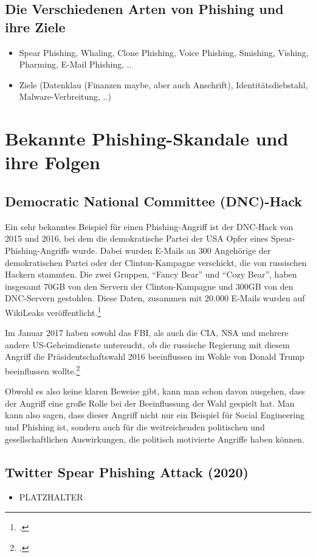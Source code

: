 \documentclass[12pt, a4paper, oneside]{scrartcl}
\begin{document}
\subsection{Die Verschiedenen Arten von Phishing und ihre Ziele}
\begin{itemize}
  \item Spear Phishing, Whaling, Clone Phishing, Voice Phishing, Smishing, Vishing, Pharming, E-Mail Phishing, ..
  \item Ziele (Datenklau (Finanzen maybe, aber auch Anschrift), Identitätsdiebstahl, Malware-Verbreitung, ..)
\end{itemize}

\section{Bekannte Phishing-Skandale und ihre Folgen}

\subsection{Democratic National Committee (DNC)-Hack}
Ein sehr bekanntes Beispiel für einen Phishing-Angriff ist der DNC-Hack von 2015 und 2016, 
bei dem die demokratische Partei der USA Opfer eines Spear-Phishing-Angriffs wurde. 
Dabei wurden E-Mails an 300 Angehörige der demokratischen Partei oder der Clinton-Kampagne
verschickt, die von russischen Hackern stammten. Die zwei Gruppen, ``Fancy Bear'' und ``Cozy Bear'',
haben insgesamt 70GB von den Servern der Clinton-Kampagne und 300GB von den DNC-Servern gestohlen.
Diese Daten, zusammen mit 20.000 E-Mails wurden auf WikiLeaks veröffentlicht.\footcite{IDStrong_DNC}
\par
Im Januar 2017 haben sowohl das FBI, als auch die CIA, NSA und mehrere andere US-Geheimdienste
untersucht, ob die russische Regierung mit diesem Angriff die Präsidentschaftswahl 2016 beeinflussen 
im Wohle von Donald Trump beeinflussen wollte.\footcite{NYT_DNC}
\par
Obwohl es also keine klaren Beweise gibt, kann man schon davon ausgehen, dass der Angriff eine 
große Rolle bei der Beeinflussung der Wahl gespielt hat. Man kann also sagen, dass dieser Angriff 
nicht nur ein Beispiel für Social Engineering und Phishing ist, sondern auch für die weitreichenden 
politischen und gesellschaftlichen Auswirkungen, die politisch motivierte Angriffe haben können.

\subsection{Twitter Spear Phishing Attack (2020)}
\begin{itemize}
  \item PLATZHALTER
\end{itemize}
\end{document}
